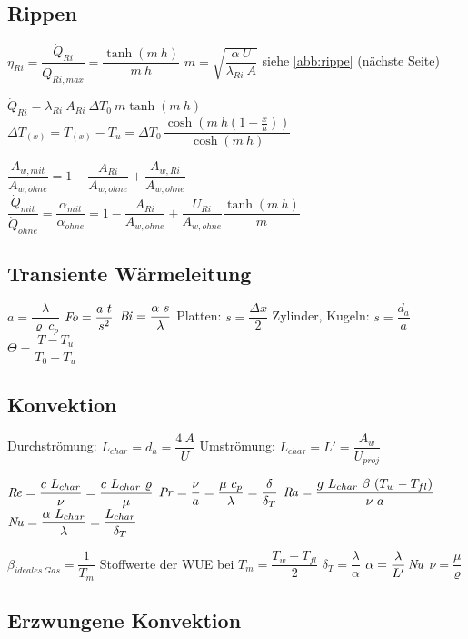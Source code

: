\clearpage

\subsection{Rippen}
	$ \eta_{Ri} = \dfrac{\dot{Q}_{Ri}}{\dot{Q}_{Ri,max}} = \dfrac{\tanh(m\ h)}{m\ h} $
		\qquad $ m = \sqrt{\dfrac{\alpha\ U}{\lambda_{Ri}\ A}} $
		\qquad siehe \ref{abb:rippe} (nächste Seite)

	$ \dot{Q}_{Ri} = \lambda_{Ri}\ A_{Ri}\ \Delta T_0\ m \tanh(m\ h) $
		\qquad  $ \Delta T_{(x)} = T_{(x)} - T_u = \Delta T_0\, \dfrac{\cosh\left(m\ h \left(1- \frac{x}{h}\right)\right)}{\cosh(m\ h)} $

	$ \dfrac{A_{w,mit}}{A_{w,ohne}} = 1 - \dfrac{A_{Ri}}{A_{w,ohne}} + \dfrac{A_{w,Ri}}{A_{w,ohne}} $
		\qquad\qquad $ \dfrac{\dot{Q}_{mit}}{\dot{Q}_{ohne}} = \dfrac{\alpha_{mit}}{\alpha_{ohne}} = 1 - \dfrac{A_{Ri}}{A_{w,ohne}}  + \dfrac{U_{Ri}}{A_{w,ohne}} \dfrac{\tanh(m\ h)}{m}$

\subsection{Transiente Wärmeleitung}
	$ a = \dfrac{\lambda}{\varrho\ c_p} $
		\quad $ \operatorname{\mathit{F\kern-.20em o}} = \dfrac{a\ t}{s^2} $
		\quad $ \operatorname{\mathit{B\kern-.10em i}} = \dfrac{\alpha\ s}{\lambda} $
		\quad Platten: $ s = \dfrac{\Delta x}{2} $
		\quad Zylinder, Kugeln: $ s = \dfrac{d_a}{a} $
		\quad $\varTheta = \dfrac{T - T_u}{T_0 - T_u}  $

\subsection{Konvektion}
	Durchströmung: $ L_{char} = d_h = \dfrac{4\ A}{U} $ \qquad Umströmung: $ L_{char} = L' = \dfrac{A_w}{U_{proj}}$

	\vskip 3pt
	$ \operatorname{\mathit{R\kern-.10em e}} = \dfrac{c\ L_{char}}{\nu} = \dfrac{c\ L_{char}\ \varrho}{\mu} $
		\quad $ \operatorname{\mathit{P\kern-.10em r}} = \dfrac{\nu}{a} = \dfrac{\mu\ c_p}{\lambda} = \dfrac{\delta}{\delta_T} $
		\quad $ \operatorname{\mathit{R\kern-.10em a}} = \dfrac{g\ L_{char}\ \beta\ (T_w - T_{fl})}  {\nu\ a} $
		\quad $ \operatorname{\mathit{N\kern-.20em u}} = \dfrac{\alpha\ L_{char}}{\lambda} = \dfrac{L_{char}}{\delta_T} $

	\vskip 6pt
	$ \beta_{ideales~Gas} = \dfrac{1}{T_m} $
		\qquad Stoffwerte der WUE bei $ T_m = \dfrac{T_w + T_{fl}}{2} $
		\qquad $ \delta_T = \dfrac{\lambda}{\alpha} $
		\qquad $ \alpha = \dfrac{\lambda}{L'} \operatorname{\mathit{N\kern-.20em u}} $
		\qquad $ \nu = \dfrac{\mu}{\varrho} $


\subsection{Erzwungene Konvektion}
